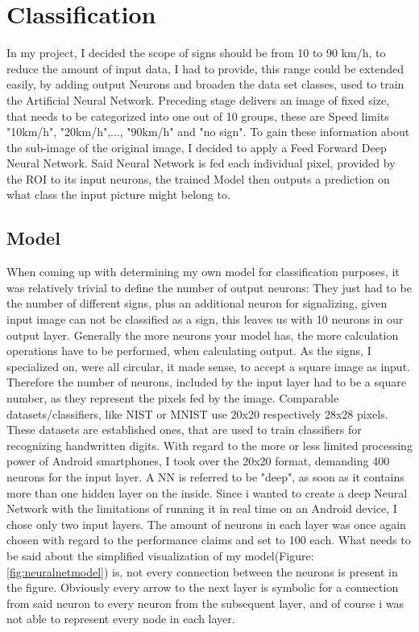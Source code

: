 \section{Classification}
In my project, I decided the scope of signs should be from 10 to 90 km/h, to reduce the amount of input data, I had to provide, this range could be extended easily, by adding output Neurons and broaden the data set classes, used to train the Artificial Neural Network. \newline\newline
Preceding stage delivers an image of fixed size, that needs to be categorized into one out of 10 groups, these are Speed limits "10km/h", "20km/h",..., "90km/h" and "no sign". To gain these information about the sub-image of the original image, I decided to apply a Feed Forward Deep Neural Network. Said Neural Network is fed each individual pixel, provided by the ROI to its input neurons, the trained Model then outputs a prediction on what class the input picture might belong to.
\newline

\subsection{Model}
When coming up with determining my own model for classification purposes, it was relatively trivial to define the number of output neurons: They just had to be the number of different signs, plus an additional neuron for signalizing, given input image can not be classified as a sign, this leaves us with 10 neurons in our output layer. Generally the more neurons your model has, the more calculation operations have to be performed, when calculating output.\newline
As the signs, I specialized on, were all circular, it made sense, to accept a square image as input. Therefore the number of neurons, included by the input layer had to be a square number, as they represent the pixels fed by the image. Comparable datasets/classifiers, like NIST or MNIST\cite{mnist} use 20x20 respectively 28x28 pixels. These datasets are established ones, that are used to train classifiers for recognizing handwritten digits. With regard to the more or less limited processing power of Android smartphones, I took over the 20x20 format, demanding 400 neurons for the input layer. \newline
A NN is referred to be "deep", as soon as it contains more than one hidden layer on the inside.
Since i wanted to create a deep Neural Network with the limitations of running it in real time on an Android device, I chose only two input layers. The amount of neurons in each layer was once again chosen with regard to the performance claims and set to 100 each.\newline
What needs to be said about the simplified visualization of my model(Figure:\ref{fig:neuralnetmodel}) is, not every connection between the neurons is present in the figure. Obviously every arrow to the next layer is symbolic for a connection from said neuron to every neuron from the subsequent layer, and of course i was not able to represent every node in each layer.

